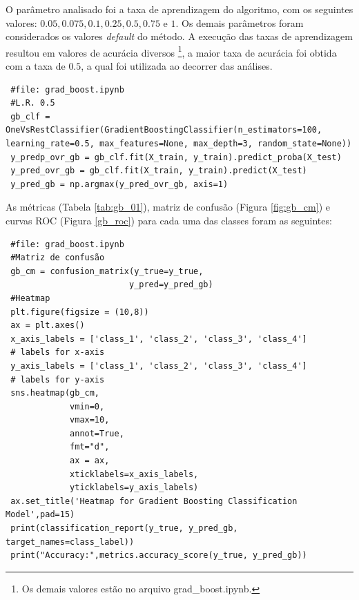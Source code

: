 \documentclass[
	article,			%
	11pt,				%
	oneside,			%
	a4paper,			%
	english,			%
	brazil,				%
	sumario=tradicional
	]{abntex2}
\begin{document}
O parâmetro analisado foi a taxa de aprendizagem do algoritmo, com os seguintes valores: $0.05, 0.075, 0.1, 0.25, 0.5, 0.75$ e $1$. Os demais parâmetros foram considerados os valores \textit{default} do método. A execução das taxas de aprendizagem resultou em valores de acurácia diversos 
\footnote{Os demais valores estão no arquivo grad\_boost.ipynb.}, a maior taxa de acurácia foi obtida com a taxa de $0.5$, a qual foi utilizada ao decorrer das análises. 

\begin{verbatim}
 #file: grad_boost.ipynb
 #L.R. 0.5
 gb_clf = OneVsRestClassifier(GradientBoostingClassifier(n_estimators=100,                                                        learning_rate=0.5, max_features=None, max_depth=3, random_state=None))
 y_predp_ovr_gb = gb_clf.fit(X_train, y_train).predict_proba(X_test)
 y_pred_ovr_gb = gb_clf.fit(X_train, y_train).predict(X_test)
 y_pred_gb = np.argmax(y_pred_ovr_gb, axis=1)
\end{verbatim}

As métricas (Tabela \ref{tab:gb_01}), matriz de confusão (Figura \ref{fig:gb_cm}) e curvas ROC (Figura \ref{gb_roc}) para cada uma das classes foram as seguintes:

\begin{verbatim}
 #file: grad_boost.ipynb
 #Matriz de confusão
 gb_cm = confusion_matrix(y_true=y_true, 
                         y_pred=y_pred_gb)
 #Heatmap
 plt.figure(figsize = (10,8))
 ax = plt.axes()
 x_axis_labels = ['class_1', 'class_2', 'class_3', 'class_4'] 
 # labels for x-axis
 y_axis_labels = ['class_1', 'class_2', 'class_3', 'class_4'] 
 # labels for y-axis
 sns.heatmap(gb_cm,
             vmin=0,
             vmax=10,
             annot=True,
             fmt="d",
             ax = ax,
             xticklabels=x_axis_labels, 
             yticklabels=y_axis_labels)
 ax.set_title('Heatmap for Gradient Boosting Classification Model',pad=15)
 print(classification_report(y_true, y_pred_gb, target_names=class_label))
 print("Accuracy:",metrics.accuracy_score(y_true, y_pred_gb))
\end{verbatim}
\end{document}
